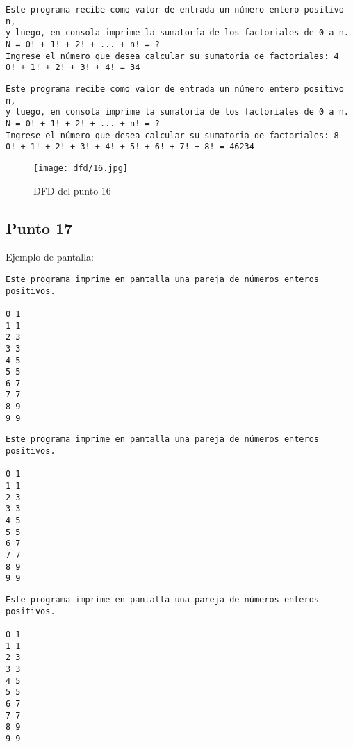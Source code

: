 \begin{lstlisting}
Este programa recibe como valor de entrada un número entero positivo n,
y luego, en consola imprime la sumatoría de los factoriales de 0 a n.
N = 0! + 1! + 2! + ... + n! = ?
Ingrese el número que desea calcular su sumatoria de factoriales: 4
0! + 1! + 2! + 3! + 4! = 34
\end{lstlisting}

\begin{lstlisting}
Este programa recibe como valor de entrada un número entero positivo n,
y luego, en consola imprime la sumatoría de los factoriales de 0 a n.
N = 0! + 1! + 2! + ... + n! = ?
Ingrese el número que desea calcular su sumatoria de factoriales: 8
0! + 1! + 2! + 3! + 4! + 5! + 6! + 7! + 8! = 46234
\end{lstlisting}

\begin{figure}
    \centering
    \texttt{[image: dfd/16.jpg]}
    \caption{ DFD del punto 16}
    \label{fig: DFD del punto 16}
\end{figure}






\subsection{Punto 17}
	
	Ejemplo de pantalla:
\begin{lstlisting}
Este programa imprime en pantalla una pareja de números enteros positivos.

0 1
1 1
2 3
3 3
4 5
5 5
6 7
7 7
8 9
9 9
\end{lstlisting}

\begin{lstlisting}
Este programa imprime en pantalla una pareja de números enteros positivos.

0 1
1 1
2 3
3 3
4 5
5 5
6 7
7 7
8 9
9 9
\end{lstlisting}

\begin{lstlisting}
Este programa imprime en pantalla una pareja de números enteros positivos.

0 1
1 1
2 3
3 3
4 5
5 5
6 7
7 7
8 9
9 9
\end{lstlisting}

